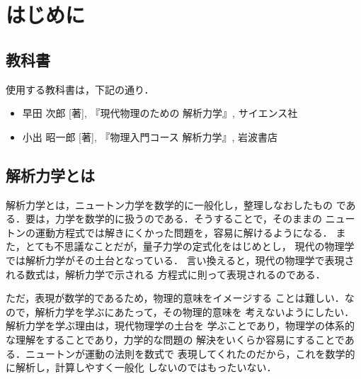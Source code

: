     \section{はじめに}
        \subsection{教科書}
            使用する教科書は，下記の通り．
            \begin{itemize}
                \item
                    早田 次郎 [著],
                    『現代物理のための 解析力学』,
                     サイエンス社
                 \item
                    小出 昭一郎 [著],
                    『物理入門コース 解析力学』,
                    岩波書店
            \end{itemize}

        \subsection{解析力学とは}
            解析力学とは，ニュートン力学を数学的に一般化し，整理しなおしたもの
            である．要は，力学を数学的に扱うのである．そうすることで，そのままの
            ニュートンの運動方程式では解きにくかった問題を，容易に解けるようになる．
            また，とても不思議なことだが，量子力学の定式化をはじめとし，
            現代の物理学では解析力学がその土台となっている．
            言い換えると，現代の物理学で表現される数式は，解析力学で示される
            方程式に則って表現されるのである．

            ただ，表現が数学的であるため，物理的意味をイメージする
            ことは難しい．なので，解析力学を学ぶにあたって，その物理的意味を
            考えないようにしたい．解析力学を学ぶ理由は，現代物理学の土台を
            学ぶことであり，物理学の体系的な理解をすることであり，力学的な問題の
            解決をいくらか容易にすることである．ニュートンが運動の法則を数式で
            表現してくれたのだから，これを数学的に解析し，計算しやすく一般化
            しないのではもったいない．

